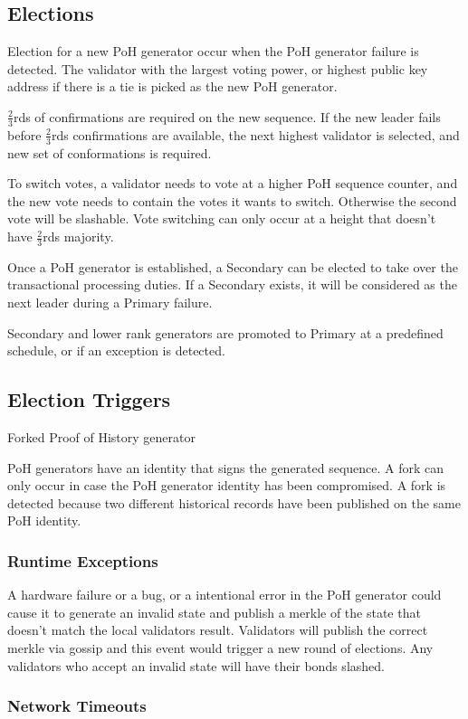 \documentclass[12pt]{article}
\begin{document}
\subsection{Elections}
Election for a new PoH generator occur when the PoH generator failure is detected.  The validator with the largest voting power, or highest public key address if there is a tie is picked as the new PoH generator.

\(\frac{2}{3}\)rds of confirmations are required on the new sequence.  If the new leader fails before \(\frac{2}{3}\)rds confirmations are available, the next highest validator is selected, and new set of conformations is required.

To switch votes, a validator needs to vote at a higher PoH sequence counter, and the new vote needs to contain the votes it wants to switch.  Otherwise the second vote will be slashable. Vote switching can only occur at a height that doesn’t have \(\frac{2}{3}\)rds majority.

Once a PoH generator is established, a Secondary can be elected to take over the transactional processing duties.  If a Secondary exists, it will be considered as the next leader during a Primary failure.

Secondary and lower rank generators are promoted to Primary at a predefined schedule, or if an exception is detected.
\subsection{Election Triggers}
Forked Proof of History generator

PoH generators have an identity that signs the generated sequence.  A fork can only occur in case the PoH generator identity has been compromised.  A fork is detected because two different historical records have been published on the same PoH identity.

\subsubsection{Runtime Exceptions}
A hardware failure or a bug, or a intentional error in the PoH generator could cause it to generate an invalid state and publish a merkle of the state that doesn’t match the local validators result.  Validators will publish the correct merkle via gossip and this event would trigger a new round of elections.  Any validators who accept an invalid state will have their bonds slashed.

\subsubsection{Network Timeouts}
\end{document}
